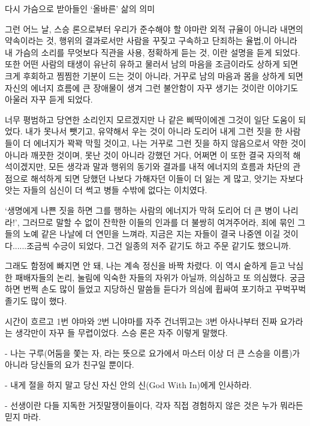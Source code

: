 \documentclass[12pt, a4paper, oneside]{book}
\begin{document}
다시 가슴으로 받아들인 ‘올바른’ 삶의 의미




그런 어느 날, 스승 론으로부터 우리가 준수해야 할 야마란 외적 규율이 아니라 내면의 약속이라는 것, 행위의 결과로서만 사람을 꾸짖고 구속하고 단죄하는 율법,이 아니라 내 가슴의 소리를 무엇보다 직관을 사용, 정확하게 듣는 것, 이란 설명을 듣게 되었다. 또한 어떤 사람의 태생이 유난히 유하고 물러서 남의 마음을 조금이라도 상하게 되면 크게 후회하고 찜찜한 기분이 드는 것이 아니라, 거꾸로 남의 마음과 몸을 상하게 되면 자신의 에너지 흐름에 큰 장애물이 생겨 그런 불안함이 자꾸 생기는 것이란 이야기도 아울러 자꾸 듣게 되었다.




너무 평범하고 당연한 소리인지 모르겠지만 나 같은 삐딱이에겐 그것이 일단 도움이 되었다. 내가 못나서 뺏기고, 유약해서 우는 것이 아니라 도리어 내게 그런 짓을 한 사람들이 더 에너지가 꽉꽉 막힐 것이고, 나는 거꾸로 그런 짓을 하지 않음으로서 약한 것이 아니라 깨끗한 것이며, 못난 것이 아니라 강했던 거다, 어쩌면 이 또한 결국 자의적 해석이겠지만, 모든 생각과 말과 행위의 동기와 결과를 내적 에너지의 흐름과 차단의 관점으로 해석하게 되면 당했던 나보다 가해자던 이들이 더 잃는 게 많고, 앗기는 자보다 앗는 자들의 심신이 더 썩고 병들 수밖에 없다는 이치였다.

‘생명에게 나쁜 짓을 하면 그를 행하는 사람의 에너지가 막혀 도리어 더 큰 병이 나리라!’, 그러므로 말할 수 없이 잔학한 이들의 인과를 더 불쌍히 여겨주어라, 죄에 묶인 그들의 노예 같은 나날에 더 연민을 느껴라, 지금은 지는 자들이 결국 나중엔 이길 것이다......조금씩 수긍이 되었다, 그건 일종의 저주 같기도 하고 주문 같기도 했으니까.

그래도 함정에 빠지면 안 돼, 나는 계속 정신을 바짝 차렸다. 이 역시 숱하게 듣고 낙심한 패배자들의 논리, 눌림에 익숙한 자들의 자위가 아닐까, 의심하고 또 의심했다. 궁금하면 번쩍 손도 많이 들었고 지당하신 말씀들 듣다가 의심에 휩싸여 포기하고 꾸벅꾸벅 졸기도 많이 했다.




시간이 흐르고 1번 야마와 2번 니야마를 자주 건너뛰고는 3번 아사나부터 진짜 요가라는 생각만이 자꾸 들 무렵이었다. 스승 론은 자주 이렇게 말했다. 




- 나는 구루(어둠을 쫓는 자, 라는 뜻으로 요가에서 마스터 이상 더 큰 스승을 이름)가 아니라 당신들의 요가 친구일 뿐이다.

- 내게 절을 하지 말고 당신 자신 안의 신(God With In)에게 인사하라.

- 선생이란 다들 지독한 거짓말쟁이들이다, 각자 직접 경험하지 않은 것은 누가 뭐라든 믿지 마라.
\end{document}
